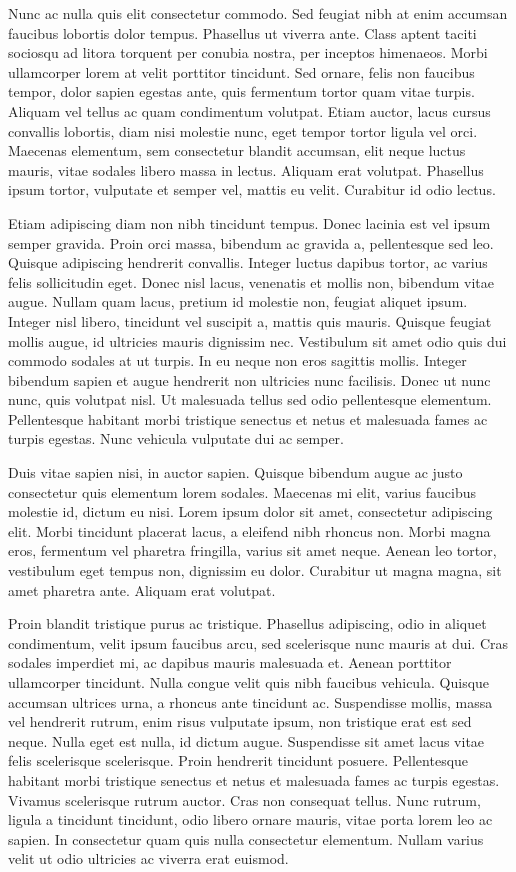\documentclass[a4paper]{article}
\begin{document}
Nunc ac nulla quis elit consectetur commodo. Sed feugiat nibh at enim accumsan faucibus lobortis dolor tempus. Phasellus ut viverra ante. Class aptent taciti sociosqu ad litora torquent per conubia nostra, per inceptos himenaeos. Morbi ullamcorper lorem at velit porttitor tincidunt. Sed ornare, felis non faucibus tempor, dolor sapien egestas ante, quis fermentum tortor quam vitae turpis. Aliquam vel tellus ac quam condimentum volutpat. Etiam auctor, lacus cursus convallis lobortis, diam nisi molestie nunc, eget tempor tortor ligula vel orci. Maecenas elementum, sem consectetur blandit accumsan, elit neque luctus mauris, vitae sodales libero massa in lectus. Aliquam erat volutpat. Phasellus ipsum tortor, vulputate et semper vel, mattis eu velit. Curabitur id odio lectus.

Etiam adipiscing diam non nibh tincidunt tempus. Donec lacinia est vel ipsum semper gravida. Proin orci massa, bibendum ac gravida a, pellentesque sed leo. Quisque adipiscing hendrerit convallis. Integer luctus dapibus tortor, ac varius felis sollicitudin eget. Donec nisl lacus, venenatis et mollis non, bibendum vitae augue. Nullam quam lacus, pretium id molestie non, feugiat aliquet ipsum. Integer nisl libero, tincidunt vel suscipit a, mattis quis mauris. Quisque feugiat mollis augue, id ultricies mauris dignissim nec. Vestibulum sit amet odio quis dui commodo sodales at ut turpis. In eu neque non eros sagittis mollis. Integer bibendum sapien et augue hendrerit non ultricies nunc facilisis. Donec ut nunc nunc, quis volutpat nisl. Ut malesuada tellus sed odio pellentesque elementum. Pellentesque habitant morbi tristique senectus et netus et malesuada fames ac turpis egestas. Nunc vehicula vulputate dui ac semper.

Duis vitae sapien nisi, in auctor sapien. Quisque bibendum augue ac justo consectetur quis elementum lorem sodales. Maecenas mi elit, varius faucibus molestie id, dictum eu nisi. Lorem ipsum dolor sit amet, consectetur adipiscing elit. Morbi tincidunt placerat lacus, a eleifend nibh rhoncus non. Morbi magna eros, fermentum vel pharetra fringilla, varius sit amet neque. Aenean leo tortor, vestibulum eget tempus non, dignissim eu dolor. Curabitur ut magna magna, sit amet pharetra ante. Aliquam erat volutpat.

Proin blandit tristique purus ac tristique. Phasellus adipiscing, odio in aliquet condimentum, velit ipsum faucibus arcu, sed scelerisque nunc mauris at dui. Cras sodales imperdiet mi, ac dapibus mauris malesuada et. Aenean porttitor ullamcorper tincidunt. Nulla congue velit quis nibh faucibus vehicula. Quisque accumsan ultrices urna, a rhoncus ante tincidunt ac. Suspendisse mollis, massa vel hendrerit rutrum, enim risus vulputate ipsum, non tristique erat est sed neque. Nulla eget est nulla, id dictum augue. Suspendisse sit amet lacus vitae felis scelerisque scelerisque. Proin hendrerit tincidunt posuere. Pellentesque habitant morbi tristique senectus et netus et malesuada fames ac turpis egestas. Vivamus scelerisque rutrum auctor. Cras non consequat tellus. Nunc rutrum, ligula a tincidunt tincidunt, odio libero ornare mauris, vitae porta lorem leo ac sapien. In consectetur quam quis nulla consectetur elementum. Nullam varius velit ut odio ultricies ac viverra erat euismod.
\end{document}
